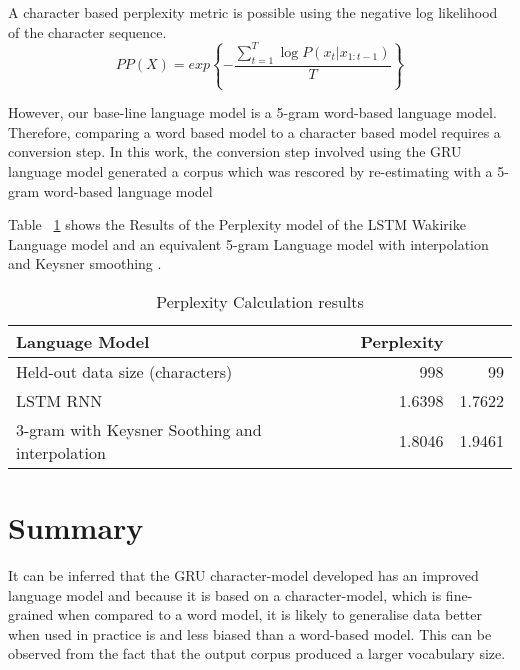A character based perplexity metric is possible using  the negative log likelihood of the character sequence.
\begin{equation}
    PP(X)=exp\left\{−\frac{\sum_{t=1}^T\log P(x_t|x_{1:t−1})}{T}\right\}
\label{ch5_eq3_ppx}
\end{equation}

However, our base-line language model is a 5-gram word-based language model.  Therefore, comparing a word based model to a character based model requires a conversion step. In this work, the conversion step involved using the GRU language model generated a corpus which was rescored by re-estimating with a 5-gram word-based language model

Table ~\ref{tab:example} shows the Results of the Perplexity model of the LSTM Wakirike Language model and an equivalent 5-gram Language model with interpolation and Keysner smoothing \citep{Heafield-estimate}.


\begin{table}
  \caption{Perplexity Calculation results}
  \label{tab:example}
\begin{tabular}{lrr}
\toprule
Language Model & Perplexity  \\
\midrule
Held-out data size (characters) & 998 & 99\\
\midrule
LSTM RNN & 1.6398 & 1.7622\\
3-gram with Keysner Soothing and interpolation & 1.8046 & 1.9461\\
\bottomrule
\end{tabular}
\end{table}
\section{Summary}
It can be inferred that the GRU character-model developed has an improved language model and because it is based on a character-model, which is fine-grained when compared to a word model, it is likely to generalise data better when used in practice is and less biased than a word-based model.  This can be observed from the fact that the output corpus produced a larger vocabulary size.
